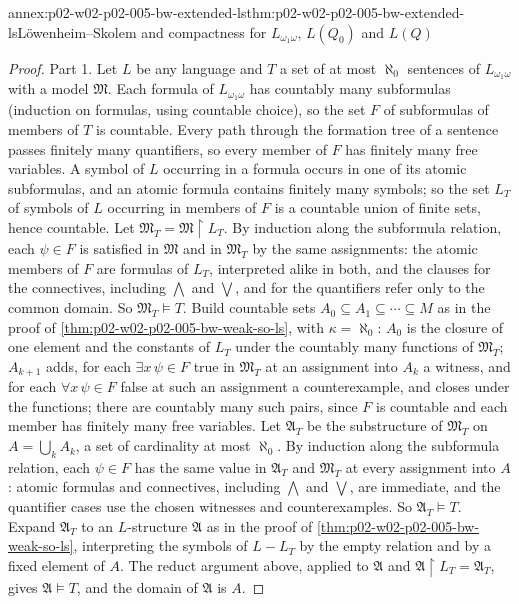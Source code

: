 \begin{annexitem}{annex:p02-w02-p02-005-bw-extended-ls}{thm:p02-w02-p02-005-bw-extended-ls}{L\"owenheim--Skolem and compactness for \(L_{\omega_1\omega}\), \(L(Q_0)\) and \(L(Q)\)}
\begin{proof}
Part 1.  Let \(L\) be any language and \(T\) a set of at most
\(\aleph_0\) sentences of \(L_{\omega_1\omega}\) with a model
\(\mathfrak M\).  Each formula of \(L_{\omega_1\omega}\) has countably many
subformulas (induction on formulas, using countable choice), so the set
\(F\) of subformulas of members of \(T\) is countable.  Every path through
the formation tree of a sentence passes finitely many quantifiers, so
every member of \(F\) has finitely many free variables.  A symbol of \(L\)
occurring in a formula occurs in one of its atomic subformulas, and an
atomic formula contains finitely many symbols; so the set \(L_T\) of
symbols of \(L\) occurring in members of \(F\) is a countable union of
finite sets, hence countable.  Let \(\mathfrak M_T=\mathfrak M\restriction
L_T\).  By induction along the subformula relation, each \(\psi\in F\) is
satisfied in \(\mathfrak M\) and in \(\mathfrak M_T\) by the same
assignments: the atomic members of \(F\) are formulas of \(L_T\),
interpreted alike in both, and the clauses for the connectives, including
\(\bigwedge\) and \(\bigvee\), and for the quantifiers refer only to the
common domain.  So \(\mathfrak M_T\models T\).  Build countable sets
\(A_0\subseteq A_1\subseteq\cdots\subseteq M\) as in the proof of
\cref{thm:p02-w02-p02-005-bw-weak-so-ls}, with \(\kappa=\aleph_0\):
\(A_0\) is the closure of one element and the constants of \(L_T\) under
the countably many functions of \(\mathfrak M_T\); \(A_{k+1}\) adds, for
each \(\exists x\,\psi\in F\) true in \(\mathfrak M_T\) at an assignment
into \(A_k\) a witness, and for each \(\forall x\,\psi\in F\) false at such
an assignment a counterexample, and closes under the functions; there are
countably many such pairs, since \(F\) is countable and each member has
finitely many free variables.  Let \(\mathfrak A_T\) be the substructure of
\(\mathfrak M_T\) on \(A=\bigcup_kA_k\), a set of cardinality at most
\(\aleph_0\).  By induction along the subformula relation, each
\(\psi\in F\) has the same value in \(\mathfrak A_T\) and \(\mathfrak M_T\)
at every assignment into \(A\): atomic formulas and connectives, including
\(\bigwedge\) and \(\bigvee\), are immediate, and the quantifier cases use
the chosen witnesses and counterexamples.  So \(\mathfrak A_T\models T\).
Expand \(\mathfrak A_T\) to an \(L\)-structure \(\mathfrak A\) as in the
proof of \cref{thm:p02-w02-p02-005-bw-weak-so-ls}, interpreting the
symbols of \(L-L_T\) by the empty relation and by a fixed element of
\(A\).  The reduct argument above, applied to \(\mathfrak A\) and
\(\mathfrak A\restriction L_T=\mathfrak A_T\), gives \(\mathfrak A\models
T\), and the domain of \(\mathfrak A\) is \(A\).


\end{proof}
\end{annexitem}
